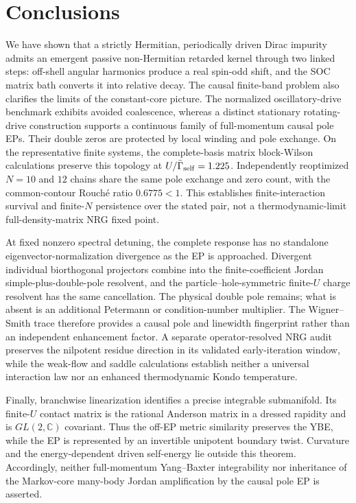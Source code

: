 \documentclass[%
  aps,prb,reprint,amsmath,amssymb,superscriptaddress,longbibliography,floatfix
]{revtex4-2}
\begin{document}
\section{Conclusions}
\label{sec:conc}

We have shown that a strictly Hermitian, periodically driven Dirac impurity
admits an emergent passive non-Hermitian retarded kernel through two linked
steps: off-shell angular harmonics produce a real spin-odd shift, and the SOC
matrix bath converts it into relative decay.  The causal finite-band problem
also clarifies the limits of the constant-core picture.  The normalized
oscillatory-drive benchmark exhibits avoided coalescence, whereas a distinct
stationary rotating-drive construction supports a continuous family of
full-momentum causal pole EPs.  Their double zeros are protected by local
winding and pole exchange.  On the representative finite systems, the
complete-basis matrix block-Wilson calculations preserve this topology at
$U/\bar\Gamma_{\rm self}=1.225$.  Independently reoptimized $N=10$ and $12$
chains share the same pole exchange and zero count, with the common-contour
Rouch\'e ratio $0.6775<1$.  This establishes finite-interaction survival and
finite-$N$ persistence over the stated pair, not a thermodynamic-limit
full-density-matrix NRG fixed point.

At fixed nonzero spectral detuning, the complete response has no standalone
eigenvector-normalization divergence as the EP is approached.  Divergent
individual biorthogonal projectors combine into the finite-coefficient Jordan
simple-plus-double-pole resolvent, and the particle--hole-symmetric finite-$U$
charge resolvent has the same cancellation.  The physical double pole remains;
what is absent is an additional Petermann or condition-number multiplier.
The Wigner--Smith trace therefore
provides a causal pole and linewidth fingerprint rather than an independent
enhancement factor.  A separate operator-resolved NRG audit preserves the
nilpotent residue direction in its validated early-iteration window, while
the weak-flow and saddle calculations establish neither a universal
interaction law nor an enhanced thermodynamic Kondo temperature.

Finally, branchwise linearization identifies a precise integrable
submanifold.  Its finite-$U$ contact matrix is the rational Anderson matrix
in a dressed rapidity and is $GL(2,\mathbb C)$ covariant.  Thus the off-EP
metric similarity preserves the YBE, while the EP is represented by an
invertible unipotent boundary twist.  Curvature and the energy-dependent
driven self-energy lie outside this theorem.  Accordingly, neither
full-momentum Yang--Baxter integrability nor inheritance of the Markov-core
many-body Jordan amplification by the causal pole EP is asserted.
\end{document}
